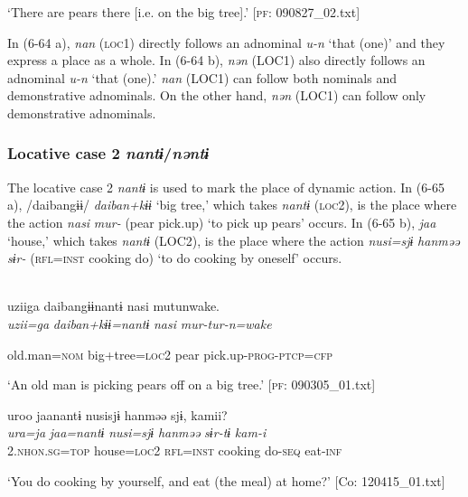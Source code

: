 \glt ‘There are pears there [i.e. on the big tree].’ [\textsc{pf}: 090827\_02.txt]
\z

In (6-64 a), \textit{nan} (\textsc{loc}1) directly follows an adnominal \textit{u-n} ‘that (one)’ and they express a place as a whole. In (6-64 b), \textit{nən} (LOC1) also directly follows an adnominal \textit{u-n} ‘that (one).’ \textit{nan} (LOC1) can follow both nominals and demonstrative adnominals. On the other hand, \textit{nən} (LOC1) can follow only demonstrative adnominals.

\subsubsection{Locative case 2 \textit{nantɨ}/\textit{nəntɨ}}

The locative case 2 \textit{nantɨ} is used to mark the place of dynamic action. In (6-65 a), /daibangɨɨ/ \textit{daiban+kɨɨ} ‘big tree,’ which takes \textit{nantɨ} (\textsc{loc}2), is the place where the action \textit{nasi} \textit{mur-} (pear pick.up) ‘to pick up pears’ occurs. In (6-65 b), \textit{jaa} ‘house,’ which takes \textit{nantɨ} (LOC2), is the place where the action \textit{nusi=sjɨ} \textit{hanməə} \textit{sɨr-} (\textsc{rfl}=\textsc{inst} cooking do) ‘to do cooking by oneself’ occurs.

\ea\label{ex:6-65}
\ea\relax[= \REF{ex:6-53}]\\
\gll  {\TM}  uziiga  daibangɨɨnantɨ  nasi  mutunwake.\\

      \textit{uzii=ga}  \textit{daiban+kɨɨ=nantɨ}  \textit{nasi}  \textit{mur-tur-n=wake}

      old.man=\textsc{nom}  big+tree=\textsc{loc}2  pear  pick.up-\textsc{prog}-\textsc{ptcp}=\textsc{cfp}

\glt ‘An old man is picking pears off on a big tree.’ [\textsc{pf}: 090305\_01.txt]
\z

 \ex {\TM}  uroo  jaanantɨ  nusisjɨ  hanməə  sjɨ,  kamii?\\
\gll \textit{ura=ja}  \textit{jaa=nantɨ}  \textit{nusi=sjɨ}  \textit{hanməə}  \textit{sɨr-tɨ}  \textit{kam-i}\\

      2.\textsc{nhon}.\textsc{sg}=\textsc{top}  house=\textsc{loc}2  \textsc{rfl}=\textsc{inst}  cooking  do-\textsc{seq}  eat-\textsc{inf}

\glt ‘You do cooking by yourself, and eat (the meal) at home?’ [Co: 120415\_01.txt]
\z

